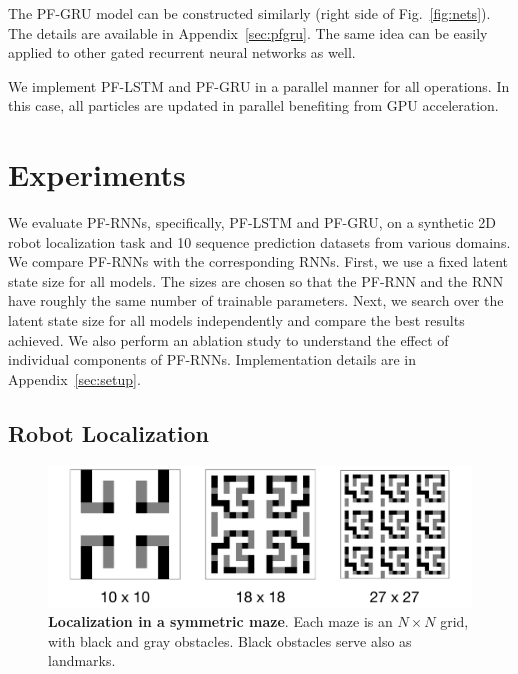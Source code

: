 \documentclass[letterpaper]{article} %
\begin{document}
The PF-GRU model can be constructed similarly (right side of Fig.~\ref{fig:nets}). The details are available in Appendix~\ref{sec:pfgru}. The same idea can be easily applied to other gated recurrent neural networks as well.

We implement PF-LSTM and PF-GRU in a parallel manner for all operations. In this case, all particles are updated in parallel benefiting from GPU acceleration.

\section{Experiments}

We evaluate PF-RNNs, specifically,  PF-LSTM and PF-GRU, on a synthetic 2D robot localization task and 10 sequence prediction datasets from various domains.
We compare PF-RNNs with the corresponding RNNs.
First, we use a fixed
latent state size for all models. The sizes are chosen so that the PF-RNN and the RNN have roughly the same number of trainable parameters. Next, we search over the latent state size for all models independently and compare the best results achieved.
We also perform an ablation study to understand the effect of individual components of PF-RNNs.
Implementation details are in Appendix~\ref{sec:setup}. 

\subsection{Robot Localization}

\begin{figure}[!htb]
	\centering
	\includegraphics[width=\linewidth]{figs/maze.pdf}
	\centering
	\caption{\textbf{Localization in a symmetric maze}. Each maze is an $N\times N$ grid, with black and gray obstacles. Black obstacles serve also as landmarks.}
	\label{fig:maze}
\end{figure}
\end{document}
